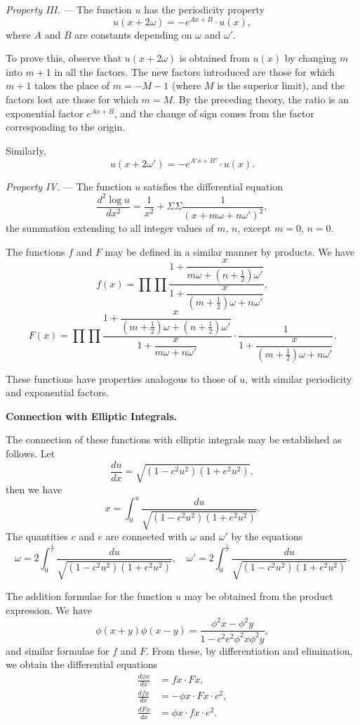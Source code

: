\documentclass[12pt,a4paper]{article}
\begin{document}
\newpage
\setcounter{page}{142}

\textit{Property III.} --- The function $u$ has the periodicity property
\[
u(x + 2\omega) = -e^{Ax + B} \cdot u(x),\]
where $A$ and $B$ are constants depending on $\omega$ and $\omega'$.

To prove this, observe that $u(x + 2\omega)$ is obtained from $u(x)$ by changing $m$ into
$m + 1$ in all the factors. The new factors introduced are those for which $m + 1$ takes
the place of $m = -M - 1$ (where $M$ is the superior limit), and the factors lost are
those for which $m = M$. By the preceding theory, the ratio is an exponential factor
$e^{Ax + B}$, and the change of sign comes from the factor corresponding to the origin.

Similarly,
\[
u(x + 2\omega') = -e^{A'x + B'} \cdot u(x).\]

\textit{Property IV.} --- The function $u$ satisfies the differential equation
\[
\frac{d^2 \log u}{dx^2} = \frac{1}{x^2} + \Sigma \Sigma \frac{1}{(x + m\omega + n\omega')^2},
\]
the summation extending to all integer values of $m$, $n$, except $m = 0$, $n = 0$.

\newpage
\setcounter{page}{143}

The functions $f$ and $F$ may be defined in a similar manner by products. We have
\[
f(x) = \prod \prod \frac{1 + \dfrac{x}{m\omega + (n + \frac{1}{2})\omega'}}{1 + \dfrac{x}{(m + \frac{1}{2})\omega + n\omega'}},
\]
\[
F(x) = \prod \prod \frac{1 + \dfrac{x}{(m + \frac{1}{2})\omega + (n + \frac{1}{2})\omega'}}{1 + \dfrac{x}{m\omega + n\omega'}} \cdot \frac{1}{1 + \dfrac{x}{(m + \frac{1}{2})\omega + n\omega'}}.
\]

These functions have properties analogous to those of $u$, with similar periodicity
and exponential factors.

\medskip

\textbf{Connection with Elliptic Integrals.}

The connection of these functions with elliptic integrals may be established as
follows. Let
\[
\frac{du}{dx} = \sqrt{(1 - c^2 u^2)(1 + e^2 u^2)},
\]
then we have
\[
x = \int_0^u \frac{du}{\sqrt{(1 - c^2 u^2)(1 + e^2 u^2)}}.
\]
The quantities $c$ and $e$ are connected with $\omega$ and $\omega'$ by the equations
\[
\omega = 2\int_0^{\frac{1}{c}} \frac{du}{\sqrt{(1 - c^2 u^2)(1 + e^2 u^2)}},\quad
\omega' = 2\int_0^{\frac{1}{e}} \frac{du}{\sqrt{(1 - c^2 u^2)(1 + e^2 u^2)}}.
\]

\newpage
\setcounter{page}{144}

The addition formulae for the function $u$ may be obtained from the product
expression. We have
\[
\phi(x + y)\phi(x - y) = \frac{\phi^2 x - \phi^2 y}{1 - c^2 e^2 \phi^2 x \phi^2 y},
\]
and similar formulae for $f$ and $F$. From these, by differentiation and elimination,
we obtain the differential equations
\begin{align*}
\frac{d\phi x}{dx} &= f x \cdot F x,\\
\frac{d f x}{dx} &= -\phi x \cdot F x \cdot c^2,\\
\frac{d F x}{dx} &= \phi x \cdot f x \cdot e^2.
\end{align*}
\end{document}
